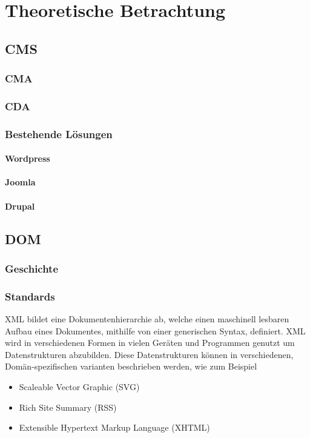 \chapter{Theoretische Betrachtung}
\section{\acl{CMS}}
\subsection{\acl{CMA}}
\subsection{\acl{CDA}}
\subsection{Bestehende Lösungen}
\subsubsection{Wordpress}
\subsubsection{Joomla}
\subsubsection{Drupal}

\section{\acl{DOM}}
\subsection{Geschichte}
\subsection{Standards}
\ac{XML} bildet eine Dokumentenhierarchie ab, welche einen maschinell lesbaren Aufbau eines
Dokumentes, mithilfe von einer generischen Syntax, definiert. \ac{XML} wird in
verschiedenen Formen in vielen Geräten und Programmen genutzt um Datenstrukturen
abzubilden. Diese Datenstrukturen können in verschiedenen, Domän-spezifischen
varianten beschrieben werden, wie zum Beispiel

\begin{itemize}
\item Scaleable Vector Graphic (SVG)
\item Rich Site Summary (RSS)
\item Extensible Hypertext Markup Language (XHTML)
\end{itemize}

